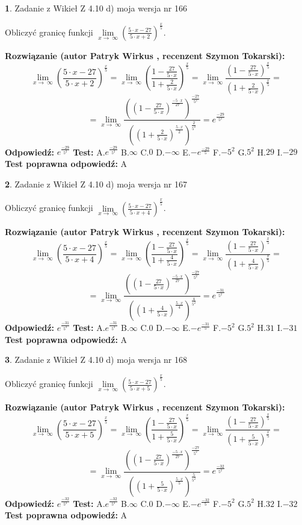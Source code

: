 \documentclass[12pt, a4paper]{article}
\theoremstyle{definition} %
\newtheorem{zad}{}
\newcommand{\zadStart}[1]{\begin{zad}#1\newline}
\newcommand{\zadStop}{\end{zad}}
\newcommand{\rozwStart}[2]{\noindent \textbf{Rozwiązanie (autor #1 , recenzent #2): }\newline}
\newcommand{\rozwStop}{\newline}
\newcommand{\odpStart}{\noindent \textbf{Odpowiedź:}\newline}
\newcommand{\odpStop}{\newline}
\newcommand{\testStart}{\noindent \textbf{Test:}\newline}
\newcommand{\testStop}{\newline}
\newcommand{\kluczStart}{\noindent \textbf{Test poprawna odpowiedź:}\newline}
\newcommand{\kluczStop}{\newline}
\begin{document}
\zadStart{Zadanie z Wikieł Z 4.10 d) moja wersja nr 166}


Obliczyć granicę funkcji  $\lim\limits_{x\to\ \infty}(\frac{5\cdot x-27}{5\cdot x+2})^{\frac{x}{5}}$.
\zadStop
\rozwStart{Patryk Wirkus}{Szymon Tokarski}
$$\lim\limits_{x\to\ \infty}(\frac{5\cdot x-27}{5\cdot x+2})^{\frac{x}{5}} = \lim\limits_{x\to\ \infty}(\frac{1-\frac{27}{5\cdot x}}{1+\frac{2}{5\cdot x}})^{\frac{x}{5}}=\lim\limits_{x\to\ \infty}\frac{(1-\frac{27}{5\cdot x})^{\frac{x}{5}}}{(1+\frac{2}{5\cdot x})^{\frac{x}{5}}}=$$
$$=\lim\limits_{x\to\ \infty}\frac{((1-\frac{27}{5\cdot x})^{\frac{-5\cdot x}{27}})^{\frac{-27}{5^{2}}}}{((1+\frac{2}{5\cdot x})^{\frac{5\cdot x}{2}})^{\frac{2}{5^{2}}}}=e^{\frac{-29}{5^{2}}}$$
\rozwStop
\odpStart
$e^{\frac{-29}{5^{2}}}$
\odpStop
\testStart
A.$e^{\frac{-29}{5^{2}}}$ B.$\infty$ C.$0$ D.$-\infty$ E.$-e^{\frac{-29}{5}}$
F.$-5^{2}$ G.$5^{2}$
H.$29$
I.$-29$
\testStop
\kluczStart
A
\kluczStop



\zadStart{Zadanie z Wikieł Z 4.10 d) moja wersja nr 167}


Obliczyć granicę funkcji  $\lim\limits_{x\to\ \infty}(\frac{5\cdot x-27}{5\cdot x+4})^{\frac{x}{5}}$.
\zadStop
\rozwStart{Patryk Wirkus}{Szymon Tokarski}
$$\lim\limits_{x\to\ \infty}(\frac{5\cdot x-27}{5\cdot x+4})^{\frac{x}{5}} = \lim\limits_{x\to\ \infty}(\frac{1-\frac{27}{5\cdot x}}{1+\frac{4}{5\cdot x}})^{\frac{x}{5}}=\lim\limits_{x\to\ \infty}\frac{(1-\frac{27}{5\cdot x})^{\frac{x}{5}}}{(1+\frac{4}{5\cdot x})^{\frac{x}{5}}}=$$
$$=\lim\limits_{x\to\ \infty}\frac{((1-\frac{27}{5\cdot x})^{\frac{-5\cdot x}{27}})^{\frac{-27}{5^{2}}}}{((1+\frac{4}{5\cdot x})^{\frac{5\cdot x}{4}})^{\frac{4}{5^{2}}}}=e^{\frac{-31}{5^{2}}}$$
\rozwStop
\odpStart
$e^{\frac{-31}{5^{2}}}$
\odpStop
\testStart
A.$e^{\frac{-31}{5^{2}}}$ B.$\infty$ C.$0$ D.$-\infty$ E.$-e^{\frac{-31}{5}}$
F.$-5^{2}$ G.$5^{2}$
H.$31$
I.$-31$
\testStop
\kluczStart
A
\kluczStop



\zadStart{Zadanie z Wikieł Z 4.10 d) moja wersja nr 168}


Obliczyć granicę funkcji  $\lim\limits_{x\to\ \infty}(\frac{5\cdot x-27}{5\cdot x+5})^{\frac{x}{5}}$.
\zadStop
\rozwStart{Patryk Wirkus}{Szymon Tokarski}
$$\lim\limits_{x\to\ \infty}(\frac{5\cdot x-27}{5\cdot x+5})^{\frac{x}{5}} = \lim\limits_{x\to\ \infty}(\frac{1-\frac{27}{5\cdot x}}{1+\frac{5}{5\cdot x}})^{\frac{x}{5}}=\lim\limits_{x\to\ \infty}\frac{(1-\frac{27}{5\cdot x})^{\frac{x}{5}}}{(1+\frac{5}{5\cdot x})^{\frac{x}{5}}}=$$
$$=\lim\limits_{x\to\ \infty}\frac{((1-\frac{27}{5\cdot x})^{\frac{-5\cdot x}{27}})^{\frac{-27}{5^{2}}}}{((1+\frac{5}{5\cdot x})^{\frac{5\cdot x}{5}})^{\frac{5}{5^{2}}}}=e^{\frac{-32}{5^{2}}}$$
\rozwStop
\odpStart
$e^{\frac{-32}{5^{2}}}$
\odpStop
\testStart
A.$e^{\frac{-32}{5^{2}}}$ B.$\infty$ C.$0$ D.$-\infty$ E.$-e^{\frac{-32}{5}}$
F.$-5^{2}$ G.$5^{2}$
H.$32$
I.$-32$
\testStop
\kluczStart
A
\kluczStop
\end{document}
